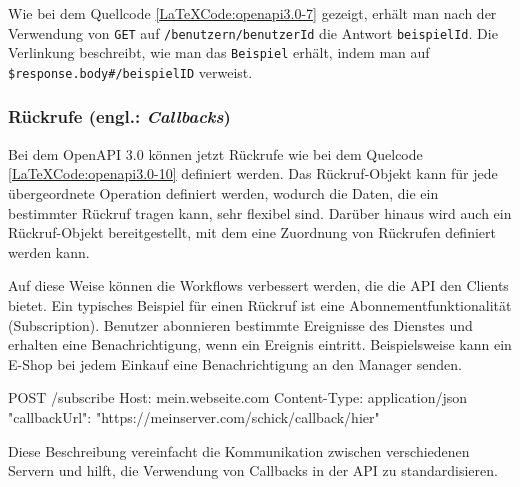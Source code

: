 \begin{LaTeXCode}[caption={Open API 3.0 - Verlinkungen},captionpos=b, label=LaTeXCode:openapi3.0-7][numbers=none]
{
	"paths": {
		"/benutzern/{benutzerId}": {
			"get": {
				"responses": {
					"200": {
						"links": {
							"address": {
								"operationId": "gibBeispielMitID"
							}
						},
						"parameters": {
							"exampleId": "\\\$response.body#/beispielID"
						}
...
\end{LaTeXCode}

Wie bei dem Quellcode \ref{LaTeXCode:openapi3.0-7} gezeigt, erhält man nach der Verwendung von \texttt{GET} auf \texttt{/benutzern/{benutzerId}} die Antwort \texttt{beispielId}. Die Verlinkung beschreibt, wie man das \texttt{Beispiel} erhält, indem man auf \texttt{\$response.body\#/beispielID} verweist.

\subsubsection{Rückrufe (engl.: \textit{Callbacks})}

Bei dem OpenAPI 3.0 können jetzt Rückrufe wie bei dem Quelcode \ref{LaTeXCode:openapi3.0-10} definiert werden. Das Rückruf-Objekt kann für jede übergeordnete Operation definiert werden, wodurch die Daten, die ein bestimmter Rückruf tragen kann, sehr flexibel sind. Darüber hinaus wird auch ein Rückruf-Objekt bereitgestellt, mit dem eine Zuordnung von Rückrufen definiert werden kann.

Auf diese Weise können die Workflows verbessert werden, die die API den Clients bietet. Ein typisches Beispiel für einen Rückruf ist eine Abonnementfunktionalität (Subscription). Benutzer abonnieren bestimmte Ereignisse des Dienstes und erhalten eine Benachrichtigung, wenn ein Ereignis eintritt. Beispielsweise kann ein E-Shop bei jedem Einkauf eine Benachrichtigung an den Manager senden\cite{openapicallbacks17}.

\begin{LaTeXCode}[caption={Open API 3.0 - Callbacks\cite{openapicallbacks17}},captionpos=b, label=LaTeXCode:openapi3.0-10][numbers=none]
POST /subscribe
Host: mein.webseite.com
Content-Type: application/json
{
	"callbackUrl": "https://meinserver.com/schick/callback/hier"
}
\end{LaTeXCode}

Diese Beschreibung vereinfacht die Kommunikation zwischen verschiedenen Servern und hilft, die Verwendung von Callbacks in der API zu standardisieren\cite{openapi20Github}.


